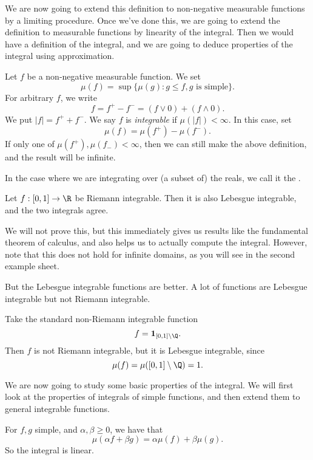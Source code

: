 \documentclass[a4paper]{article}
\begin{document}
We are now going to extend this definition to non-negative measurable functions by a limiting procedure. Once we've done this, we are going to extend the definition to measurable functions by linearity of the integral. Then we would have a definition of the integral, and we are going to deduce properties of the integral using approximation.

\begin{defi}[Integral]
  Let $f$ be a non-negative measurable function. We set
  \[
    \mu(f) = \sup\{\mu(g): g \leq f, g\text{ is simple}\}.
  \]
  For arbitrary $f$, we write
  \[
    f = f^+ - f^- = (f \vee 0) + (f \wedge 0).
  \]
  We put $|f| = f^+ + f^-$. We say $f$ is \emph{integrable} if $\mu(|f|) < \infty$. In this case, set
  \[
    \mu(f) = \mu(f^+) - \mu(f^-).
  \]
  If only one of $\mu(f^+), \mu(f_-) < \infty$, then we can still make the above definition, and the result will be infinite.
\end{defi}

In the case where we are integrating over (a subset of) the reals, we call it the .

\begin{prop}
  Let $f: [0, 1] \to \R$ be Riemann integrable. Then it is also Lebesgue integrable, and the two integrals agree.
\end{prop}
We will not prove this, but this immediately gives us results like the fundamental theorem of calculus, and also helps us to actually compute the integral. However, note that this does not hold for infinite domains, as you will see in the second example sheet.

But the Lebesgue integrable functions are better. A lot of functions are Lebesgue integrable but not Riemann integrable.
\begin{eg}
  Take the standard non-Riemann integrable function
  \[
    f = \mathbf{1}_{[0, 1]\setminus \Q}.
  \]
  Then $f$ is not Riemann integrable, but it is Lebesgue integrable, since
  \[
    \mu(f) = \mu([0, 1] \setminus \Q) = 1.
  \]
\end{eg}

We are now going to study some basic properties of the integral. We will first look at the properties of integrals of simple functions, and then extend them to general integrable functions.

For $f, g$ simple, and $\alpha, \beta \geq 0$, we have that
\[
  \mu(\alpha f + \beta g) = \alpha \mu(f) + \beta\mu(g).
\]
So the integral is linear.
\end{document}
